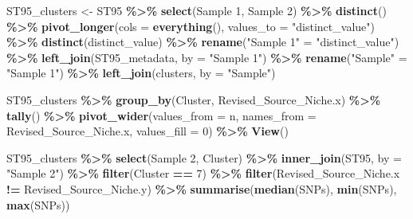\documentclass[
]{article}
\newenvironment{Shaded}{\begin{snugshade}}{\end{snugshade}}
\newcommand{\AttributeTok}[1]{\textcolor[rgb]{0.13,0.29,0.53}{#1}}
\newcommand{\DecValTok}[1]{\textcolor[rgb]{0.00,0.00,0.81}{#1}}
\newcommand{\FunctionTok}[1]{\textcolor[rgb]{0.13,0.29,0.53}{\textbf{#1}}}
\newcommand{\NormalTok}[1]{#1}
\newcommand{\OtherTok}[1]{\textcolor[rgb]{0.56,0.35,0.01}{#1}}
\newcommand{\SpecialCharTok}[1]{\textcolor[rgb]{0.81,0.36,0.00}{\textbf{#1}}}
\newcommand{\StringTok}[1]{\textcolor[rgb]{0.31,0.60,0.02}{#1}}
\begin{document}
\begin{Shaded}
\begin{Highlighting}[]
\NormalTok{ST95\_clusters }\OtherTok{\textless{}{-}}\NormalTok{ ST95 }\SpecialCharTok{\%\textgreater{}\%}
  \FunctionTok{select}\NormalTok{(}\StringTok{\textasciigrave{}}\AttributeTok{Sample 1}\StringTok{\textasciigrave{}}\NormalTok{, }\StringTok{\textasciigrave{}}\AttributeTok{Sample 2}\StringTok{\textasciigrave{}}\NormalTok{) }\SpecialCharTok{\%\textgreater{}\%}
  \FunctionTok{distinct}\NormalTok{() }\SpecialCharTok{\%\textgreater{}\%}
  \FunctionTok{pivot\_longer}\NormalTok{(}\AttributeTok{cols =} \FunctionTok{everything}\NormalTok{(), }\AttributeTok{values\_to =} \StringTok{"distinct\_value"}\NormalTok{) }\SpecialCharTok{\%\textgreater{}\%}
  \FunctionTok{distinct}\NormalTok{(distinct\_value) }\SpecialCharTok{\%\textgreater{}\%} \FunctionTok{rename}\NormalTok{(}\StringTok{"Sample 1"} \OtherTok{=} \StringTok{"distinct\_value"}\NormalTok{) }\SpecialCharTok{\%\textgreater{}\%} \FunctionTok{left\_join}\NormalTok{(ST95\_metadata, }\AttributeTok{by =} \StringTok{"Sample 1"}\NormalTok{) }\SpecialCharTok{\%\textgreater{}\%} \FunctionTok{rename}\NormalTok{(}\StringTok{"Sample"} \OtherTok{=} \StringTok{"Sample 1"}\NormalTok{) }\SpecialCharTok{\%\textgreater{}\%} \FunctionTok{left\_join}\NormalTok{(clusters, }\AttributeTok{by =} \StringTok{"Sample"}\NormalTok{)}

\NormalTok{ST95\_clusters }\SpecialCharTok{\%\textgreater{}\%} \FunctionTok{group\_by}\NormalTok{(Cluster, Revised\_Source\_Niche.x) }\SpecialCharTok{\%\textgreater{}\%} \FunctionTok{tally}\NormalTok{() }\SpecialCharTok{\%\textgreater{}\%} \FunctionTok{pivot\_wider}\NormalTok{(}\AttributeTok{values\_from =}\NormalTok{ n, }\AttributeTok{names\_from =}\NormalTok{ Revised\_Source\_Niche.x, }\AttributeTok{values\_fill =} \DecValTok{0}\NormalTok{) }\SpecialCharTok{\%\textgreater{}\%} \FunctionTok{View}\NormalTok{()}

\NormalTok{ST95\_clusters }\SpecialCharTok{\%\textgreater{}\%} \FunctionTok{select}\NormalTok{(}\StringTok{\textasciigrave{}}\AttributeTok{Sample 2}\StringTok{\textasciigrave{}}\NormalTok{, Cluster) }\SpecialCharTok{\%\textgreater{}\%} \FunctionTok{inner\_join}\NormalTok{(ST95, }\AttributeTok{by =} \StringTok{"Sample 2"}\NormalTok{) }\SpecialCharTok{\%\textgreater{}\%} \FunctionTok{filter}\NormalTok{(Cluster }\SpecialCharTok{==} \DecValTok{7}\NormalTok{) }\SpecialCharTok{\%\textgreater{}\%} \FunctionTok{filter}\NormalTok{(Revised\_Source\_Niche.x }\SpecialCharTok{!=}\NormalTok{ Revised\_Source\_Niche.y) }\SpecialCharTok{\%\textgreater{}\%} \FunctionTok{summarise}\NormalTok{(}\FunctionTok{median}\NormalTok{(SNPs), }\FunctionTok{min}\NormalTok{(SNPs), }\FunctionTok{max}\NormalTok{(SNPs))}
\end{Highlighting}
\end{Shaded}
\end{document}
